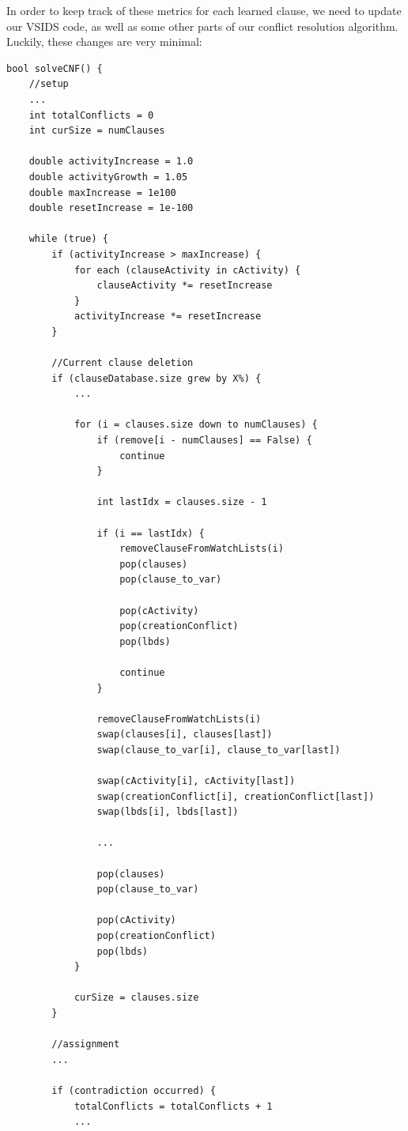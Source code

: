 \documentclass[oneside]{book}
\begin{document}
In order to keep track of these metrics for each learned clause, we need to update our 
VSIDS code, as well as some other parts of our conflict resolution algorithm. Luckily, 
these changes are very minimal:
\begin{lstlisting}
bool solveCNF() {
    //setup
    ...
    int totalConflicts = 0
    int curSize = numClauses

    double activityIncrease = 1.0
    double activityGrowth = 1.05
    double maxIncrease = 1e100
    double resetIncrease = 1e-100

    while (true) {
        if (activityIncrease > maxIncrease) {
            for each (clauseActivity in cActivity) {
                clauseActivity *= resetIncrease
            }
            activityIncrease *= resetIncrease
        }

        //Current clause deletion
        if (clauseDatabase.size grew by X%) {
            ...

            for (i = clauses.size down to numClauses) {
                if (remove[i - numClauses] == False) {
                    continue
                }

                int lastIdx = clauses.size - 1

                if (i == lastIdx) {
                    removeClauseFromWatchLists(i)
                    pop(clauses)
                    pop(clause_to_var)

                    pop(cActivity)
                    pop(creationConflict)
                    pop(lbds)

                    continue
                }

                removeClauseFromWatchLists(i)
                swap(clauses[i], clauses[last])
                swap(clause_to_var[i], clause_to_var[last])

                swap(cActivity[i], cActivity[last])
                swap(creationConflict[i], creationConflict[last])
                swap(lbds[i], lbds[last])

                ...

                pop(clauses)
                pop(clause_to_var)

                pop(cActivity)
                pop(creationConflict)
                pop(lbds)
            }

            curSize = clauses.size
        }

        //assignment
        ...

        if (contradiction occurred) {
            totalConflicts = totalConflicts + 1
            ...


\end{lstlisting}
\end{document}
